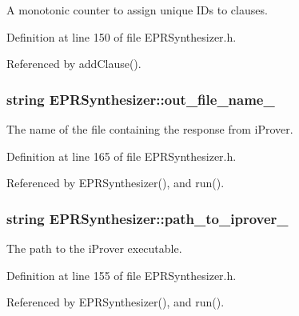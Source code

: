 A monotonic counter to assign unique I\-Ds to clauses. 



Definition at line 150 of file E\-P\-R\-Synthesizer.\-h.



Referenced by add\-Clause().

\hypertarget{classEPRSynthesizer_a40ca45e5284a5c24964730beb17d76b8}{
\subsubsection[{out\-\_\-file\-\_\-name\-\_\-}]{\setlength{\rightskip}{0pt plus 5cm}string E\-P\-R\-Synthesizer\-::out\-\_\-file\-\_\-name\-\_\-\hspace{0.3cm}{\ttfamily [protected]}}}\label{classEPRSynthesizer_a40ca45e5284a5c24964730beb17d76b8}


The name of the file containing the response from i\-Prover. 



Definition at line 165 of file E\-P\-R\-Synthesizer.\-h.



Referenced by E\-P\-R\-Synthesizer(), and run().

\hypertarget{classEPRSynthesizer_ac7fc7beb51f9c27e42941e8e20882540}{
\subsubsection[{path\-\_\-to\-\_\-iprover\-\_\-}]{\setlength{\rightskip}{0pt plus 5cm}string E\-P\-R\-Synthesizer\-::path\-\_\-to\-\_\-iprover\-\_\-\hspace{0.3cm}{\ttfamily [protected]}}}\label{classEPRSynthesizer_ac7fc7beb51f9c27e42941e8e20882540}


The path to the i\-Prover executable. 



Definition at line 155 of file E\-P\-R\-Synthesizer.\-h.



Referenced by E\-P\-R\-Synthesizer(), and run().

